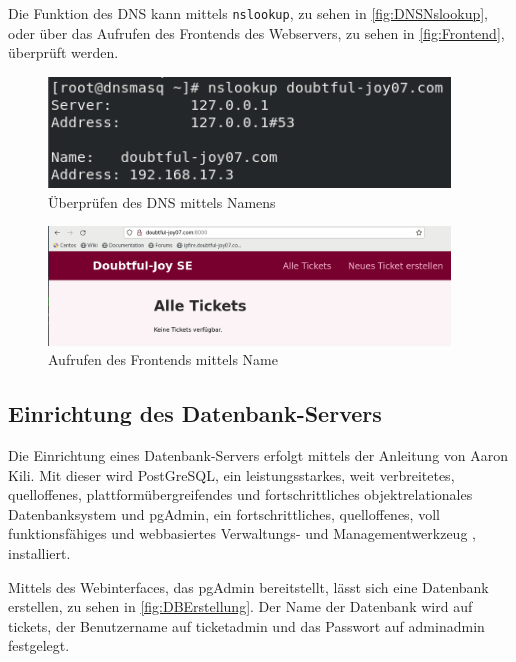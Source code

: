 \documentclass[a4paper,
    11pt,
    headings=small,
    ngerman,
    listof=totoc,
    numbers=noenddot]{scrreprt}[2021/11/13]
\begin{document}
Die Funktion des \ac{DNS} kann mittels \texttt{nslookup}, zu sehen in \vref{fig:DNSNslookup}, oder über das Aufrufen des Frontends des Webservers, zu sehen in \vref{fig:Frontend}, überprüft werden.

\begin{figure}[htbp]
  \centering
  \includegraphics[width=0.95\textwidth]{data/dns-works-nslookup.png}
  \caption{Überprüfen des DNS mittels Namens}
  \label{fig:DNSNslookup}
\end{figure}

\begin{figure}[htbp]
  \centering
  \includegraphics[width=0.95\textwidth]{data/dns-names-working.png}
  \caption{Aufrufen des Frontends mittels Name}
  \label{fig:Frontend}
\end{figure}


\subsection{Einrichtung des Datenbank-Servers}

Die Einrichtung eines Datenbank-Servers erfolgt mittels der Anleitung von Aaron Kili. \autocite{tecmint:PostgreSQLAndpgAdmin} Mit dieser wird PostGreSQL, ein \glqq{}leistungsstarkes, weit verbreitetes, quelloffenes, plattformübergreifendes und fortschrittliches objektrelationales Datenbanksystem\grqq{} \autocite{tecmint:PostgreSQLAndpgAdmin} und pgAdmin, ein \glqq{}fortschrittliches, quelloffenes, voll funktionsfähiges und webbasiertes Verwaltungs- und Managementwerkzeug\grqq{} \autocite{tecmint:PostgreSQLAndpgAdmin}, installiert.

Mittels des Webinterfaces, das pgAdmin bereitstellt, lässt sich eine Datenbank erstellen, zu sehen in \vref{fig:DBErstellung}. Der Name der Datenbank wird auf \glqq{}tickets\grqq{}, der Benutzername auf \glqq{}ticketadmin\grqq{} und das Passwort auf \glqq{}adminadmin\grqq{} festgelegt.
\end{document}
